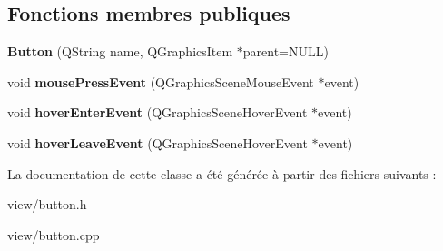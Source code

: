 \subsection*{Fonctions membres publiques}
\begin{DoxyCompactItemize}
\item 
\hypertarget{classButton_a69976e5c00874a3807b642f249c1c776}{{\bfseries Button} (Q\+String name, Q\+Graphics\+Item $\ast$parent=N\+U\+L\+L)}\label{classButton_a69976e5c00874a3807b642f249c1c776}

\item 
\hypertarget{classButton_a17d8eb0c904605b223bbc00c75655315}{void {\bfseries mouse\+Press\+Event} (Q\+Graphics\+Scene\+Mouse\+Event $\ast$event)}\label{classButton_a17d8eb0c904605b223bbc00c75655315}

\item 
\hypertarget{classButton_a633a9684818bc5d300a622a00064f09c}{void {\bfseries hover\+Enter\+Event} (Q\+Graphics\+Scene\+Hover\+Event $\ast$event)}\label{classButton_a633a9684818bc5d300a622a00064f09c}

\item 
\hypertarget{classButton_a1689a97690d9469ce8350d24db0d7485}{void {\bfseries hover\+Leave\+Event} (Q\+Graphics\+Scene\+Hover\+Event $\ast$event)}\label{classButton_a1689a97690d9469ce8350d24db0d7485}

\end{DoxyCompactItemize}


La documentation de cette classe a été générée à partir des fichiers suivants \+:\begin{DoxyCompactItemize}
\item 
view/button.\+h\item 
view/button.\+cpp\end{DoxyCompactItemize}
